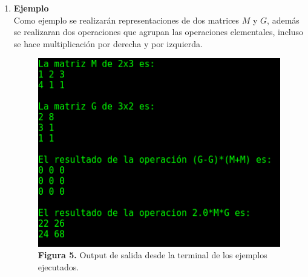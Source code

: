 \documentclass[10pt,letterpaper]{article}
\begin{document}
\begin{enumerate}
\begin{enumerate}
\end{enumerate}


\item \textbf{Ejemplo}\\
Como ejemplo se realizarán representaciones de dos matrices $M$ y $G$, además se realizaran dos operaciones que agrupan las operaciones elementales, incluso se hace multiplicación por derecha y por izquierda. 

\begin{figure}[H]
\begin{center}
\includegraphics[scale=0.3]{ejemplo}\\
\textbf{Figura 5.} Output de salida desde la terminal de los ejemplos ejecutados.  
\end{center}
\end{figure}
  

\end{enumerate}
 
\end{document}
